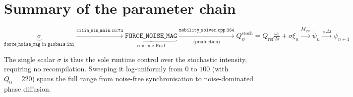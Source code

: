 \documentclass[11pt,a4paper]{article}
\newcommand{\DT}{\Delta t}
\begin{document}
\section{Summary of the parameter chain}

\begin{equation*}
\underbrace{\sigma}_{\texttt{force\_noise\_mag}\text{ in }
  \texttt{globals.ini}}
\xrightarrow{\texttt{cilia\_sim\_main.cu:74}}
\underbrace{\texttt{FORCE\_NOISE\_MAG}}_{\text{runtime Real}}
\xrightarrow[\text{(production)}]{\texttt{mobility\_solver.cpp:364}}
Q_\psi^{\text{stoch}} = Q_{\text{ref}}\tfrac{\omega_0}{2\pi} + \sigma\xi_n
\xrightarrow{M_{\psi\psi}}
\dot\psi_n
\xrightarrow{\times\DT}
\psi_{n+1}
\end{equation*}

The single scalar $\sigma$ is thus the sole runtime control over the
stochastic intensity, requiring no recompilation.  Sweeping it
log-uniformly from $0$ to $100$ (with $Q_0 = 220$) spans the full range
from noise-free synchronisation to noise-dominated phase diffusion.
\end{document}
